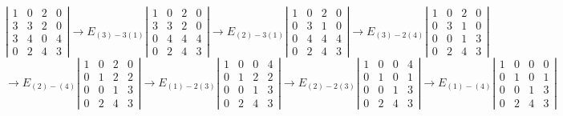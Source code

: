 \documentclass{amsart}
\begin{document}
$$
\left|\begin{array}{rrrr}
	1 & 0 & 2 & 0 \\
	3 & 3 & 2 & 0 \\
	3 & 4 & 0 & 4 \\
	0 & 2 & 4 & 3
\end{array}\right| 
\to E_{(3) - 3(1)}
\left|\begin{array}{rrrr}
	1 & 0 & 2  & 0 \\
	3 & 3 & 2  & 0 \\
	0 & 4 & 4 & 4 \\
	0 & 2 & 4  & 3
\end{array}\right| 
\to E_{(2) - 3(1)}
\left|\begin{array}{rrrr}
	1 & 0 & 2  & 0 \\
	0 & 3 & 1  & 0 \\
	0 & 4 & 4  & 4 \\
	0 & 2 & 4  & 3
\end{array}\right| 
\to E_{(3) - 2(4)}
\left|\begin{array}{rrrr}
	1 & 0 & 2 & 0 \\
	0 & 3 & 1 & 0 \\
	0 & 0 & 1 & 3 \\
	0 & 2 & 4 & 3
\end{array}\right|
$$
$$
\to E_{(2) - (4)}
\left|\begin{array}{rrrr}
	1 & 0 & 2 & 0 \\
	0 & 1 & 2 & 2 \\
	0 & 0 & 1 & 3 \\
	0 & 2 & 4 & 3
\end{array}\right| 
\to E_{(1) - 2(3)}
\left|\begin{array}{rrrr}
	1 & 0 & 0 & 4 \\
	0 & 1 & 2 & 2 \\
	0 & 0 & 1 & 3 \\
	0 & 2 & 4 & 3
\end{array}\right| 
\to E_{(2) - 2(3)}
\left|\begin{array}{rrrr}
	1 & 0 & 0 & 4 \\
	0 & 1 & 0 & 1 \\
	0 & 0 & 1 & 3 \\
	0 & 2 & 4 & 3
\end{array}\right| 
\to E_{(1) - (4)}
\left|\begin{array}{rrrr}
	1 & 0 & 0 & 0 \\
	0 & 1 & 0 & 1 \\
	0 & 0 & 1 & 3 \\
	0 & 2 & 4 & 3
\end{array}\right| 
$$
\end{document}

